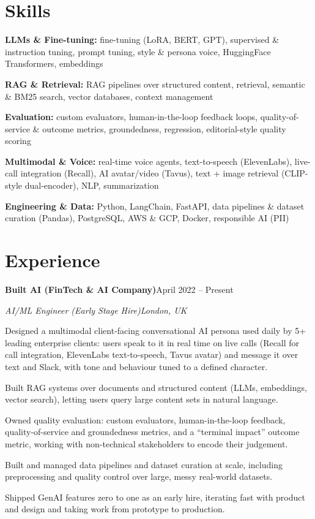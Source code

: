 \documentclass[10pt,a4paper]{article}
\newcommand{\entry}[4]{%
  {\color{company}\bfseries #1}\hfill {\color{muted}#2}\par
  \vspace{1pt}
  {\itshape #3}\hfill {\color{muted}\itshape #4}\par
  \vspace{3pt}%
}
\begin{document}
\section{Skills}
\begin{tight}
  \item[\textcolor{accent}{\small$\bullet$}] \textbf{LLMs \& Fine-tuning:} fine-tuning (LoRA, BERT, GPT), supervised \& instruction tuning, prompt tuning, style \& persona voice, HuggingFace Transformers, embeddings
  \item[\textcolor{accent}{\small$\bullet$}] \textbf{RAG \& Retrieval:} RAG pipelines over structured content, retrieval, semantic \& BM25 search, vector databases, context management
  \item[\textcolor{accent}{\small$\bullet$}] \textbf{Evaluation:} custom evaluators, human-in-the-loop feedback loops, quality-of-service \& outcome metrics, groundedness, regression, editorial-style quality scoring
  \item[\textcolor{accent}{\small$\bullet$}] \textbf{Multimodal \& Voice:} real-time voice agents, text-to-speech (ElevenLabs), live-call integration (Recall), AI avatar/video (Tavus), text + image retrieval (CLIP-style dual-encoder), NLP, summarization
  \item[\textcolor{accent}{\small$\bullet$}] \textbf{Engineering \& Data:} Python, LangChain, FastAPI, data pipelines \& dataset curation (Pandas), PostgreSQL, AWS \& GCP, Docker, responsible AI (PII)
\end{tight}

\section{Experience}
\entry{Built AI (FinTech \& AI Company)}{April 2022 -- Present}{AI/ML Engineer (Early Stage Hire)}{London, UK}
\begin{tight}
  \item Designed a multimodal client-facing conversational AI persona used daily by 5+ leading enterprise clients: users speak to it in real time on live calls (Recall for call integration, ElevenLabs text-to-speech, Tavus avatar) and message it over text and Slack, with tone and behaviour tuned to a defined character.
  \item Built RAG systems over documents and structured content (LLMs, embeddings, vector search), letting users query large content sets in natural language.
  \item Owned quality evaluation: custom evaluators, human-in-the-loop feedback, quality-of-service and groundedness metrics, and a ``terminal impact'' outcome metric, working with non-technical stakeholders to encode their judgement.
  \item Built and managed data pipelines and dataset curation at scale, including preprocessing and quality control over large, messy real-world datasets.
  \item Shipped GenAI features zero to one as an early hire, iterating fast with product and design and taking work from prototype to production.
\end{tight}
\end{document}
